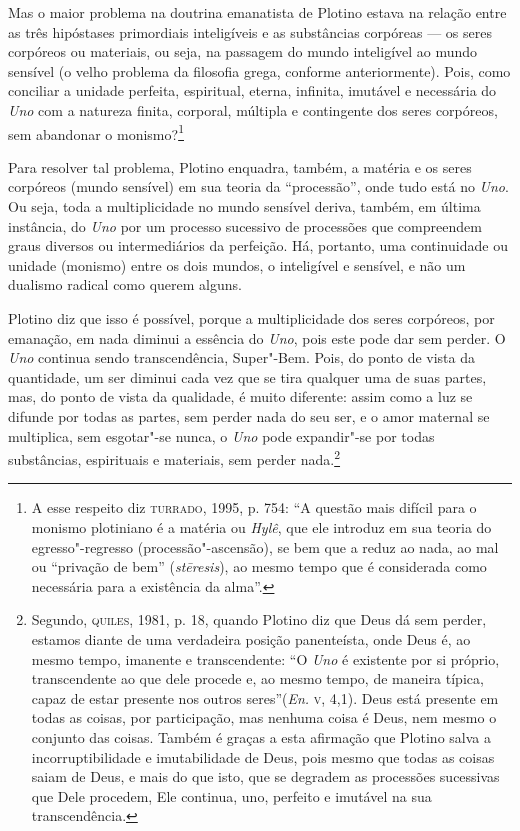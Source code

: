 Mas o maior problema  na  doutrina emanatista de Plotino estava
na relação entre as três hipóstases primordiais inteligíveis e
as substâncias corpóreas --- os seres corpóreos ou materiais, ou
seja, na passagem do mundo inteligível ao mundo sensível (o
velho problema da filosofia grega, conforme anteriormente).
Pois, como conciliar a unidade perfeita, espiritual, eterna,
infinita, imutável e necessária do \emph{Uno} com  a  natureza
finita, corporal, múltipla e contingente dos seres corpóreos,
sem  abandonar o monismo?\footnote{ A esse respeito diz
\textsc{turrado},
1995, p.  754: “A questão mais difícil para o monismo plotiniano
é  a  matéria  ou  \emph{Hylê}, que ele introduz em sua
teoria do egresso"-regresso (processão"-ascensão), se bem que a
reduz ao nada, ao mal ou ``privação de bem'' (\emph{st\={e}resis}),
ao mesmo tempo que é considerada como necessária para a 
existência da alma”.} 

Para  resolver tal problema, Plotino enquadra, também, a matéria
e os seres corpóreos (mundo sensível) em sua teoria da
“processão”, onde tudo está no \emph{Uno}. Ou seja, toda a
multiplicidade no  mundo sensível deriva, também, em última
instância, do \emph{Uno} por um processo sucessivo de
processões que compreendem graus diversos ou intermediários da
perfeição. Há, portanto, uma continuidade ou unidade (monismo)
entre os dois mundos, o inteligível e sensível, e não um
dualismo radical como querem alguns. 

Plotino diz que isso é possível, porque a multiplicidade dos
seres corpóreos, por emanação, em nada diminui a essência do
\emph{Uno}, pois este pode dar sem perder. O \emph{Uno}
continua sendo transcendência, Super"-Bem. Pois, do ponto de
vista da quantidade, um ser diminui cada  vez que  se tira
qualquer uma de suas partes, mas, do ponto de  vista da
qualidade, é muito diferente: assim como a  luz se  difunde por
todas as partes, sem perder nada do seu ser, e  o amor maternal
se multiplica, sem esgotar"-se nunca, o \emph{Uno} pode
expandir"-se por todas substâncias, espirituais e materiais, sem
perder nada.\footnote{ Segundo, \textsc{quiles}, 1981, p. 18, quando
Plotino diz que Deus dá sem perder, estamos  diante de uma
verdadeira posição panenteísta, onde Deus é, ao mesmo tempo,
imanente e transcendente: “O \emph{Uno} é existente por si
próprio, transcendente ao que dele procede e, ao mesmo tempo, de
maneira típica, capaz de estar presente nos outros
seres”(\emph{En.} \textsc{v}, 4,1). Deus está presente em todas as
coisas, por participação, mas nenhuma coisa é Deus, nem mesmo o
conjunto das coisas. Também é graças a esta afirmação que
Plotino salva a incorruptibilidade e imutabilidade de Deus, pois
mesmo que todas as coisas saiam de Deus, e mais do que isto, que
se degradem as processões sucessivas que Dele procedem, Ele
continua, uno, perfeito e imutável na sua transcendência.}

